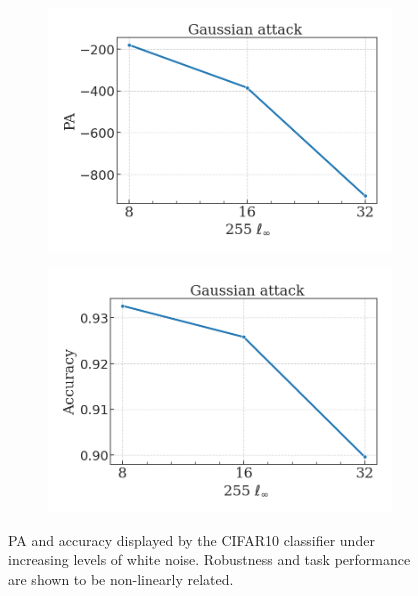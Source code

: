 \begin{figure}[H]
    \centering
    \begin{subfigure}[b]{0.45\textwidth}
        \centering
        \includegraphics[width=\textwidth]{img/results_discussion/adversarial/GAUSSIAN_logPA_eps_single.png}
    \end{subfigure}
    \hfill
    \begin{subfigure}[b]{0.45\textwidth}
        \centering
        \includegraphics[width=\textwidth]{img/results_discussion/adversarial/GAUSSIAN_acc_pa_eps_single.png}
    \end{subfigure}
    \caption{PA and accuracy displayed by the CIFAR10 classifier under increasing levels of white noise. Robustness
    and task performance are shown to be non-linearly related.
    }
    \label{fig:gaussian_noise}
\end{figure}



